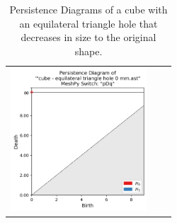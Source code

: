 \documentclass[ma]{uncgdissertationexp}
\theoremstyle{plain}
\theoremstyle{definition}
\theoremstyle{remark}
\begin{document}
\begin{table}[H]
\begin{center}
\begin{tabular}{ccc}
         \includegraphics[width=2in]{Final Run, (cube - equilateral triangle hole 0 mm) persdia.png} \\
    \end{tabular}
    \end{center}
    \caption{Persistence Diagrams of a cube with an equilateral triangle hole that decreases in size to the original shape.}
    \label{fig:cube_triangle_hole_persdia_table}
\end{table}
\end{document}
